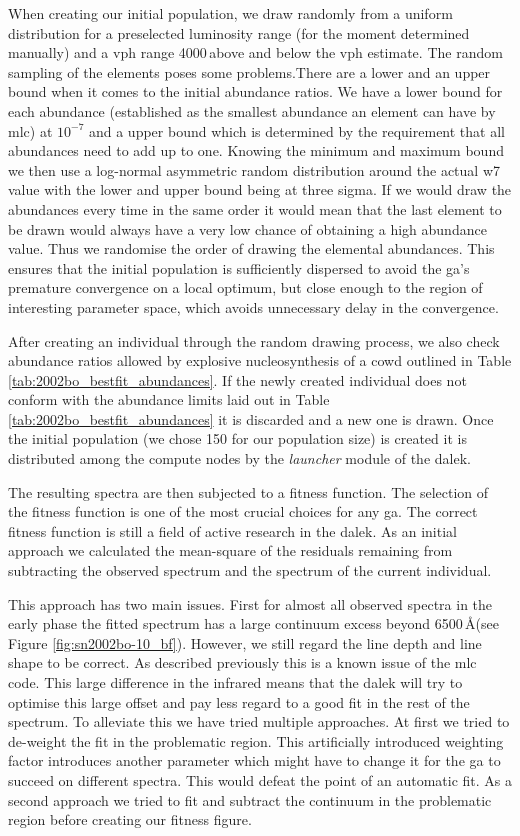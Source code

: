 When creating our initial population, we draw randomly from a uniform distribution for a preselected luminosity range (for the moment determined manually) and a \gls{vph} range 4000\,\kms above and below the \gls{vph} estimate. The random sampling of the elements poses some problems.There are a lower and an upper bound when it comes to the initial abundance ratios. We have a lower bound for each abundance (established as the smallest abundance an element can have by \gls{mlc}) at $10^{-7}$ and a upper bound which is determined by the requirement that all abundances need to add up to one. Knowing the minimum and maximum bound we then use a log-normal asymmetric random distribution around the actual \gls{w7} value with the lower and upper bound being at three sigma. If we would draw the abundances every time in the same order it would mean that the last element to be drawn would always have a very low chance of obtaining a high abundance value. Thus we randomise the order of drawing the elemental abundances. This ensures that the initial population is sufficiently dispersed to avoid the \gls{ga}'s premature convergence on a local optimum, but close enough to the region of interesting parameter space, which avoids unnecessary delay in the convergence. 

After creating an individual through the random drawing process, we also check abundance ratios allowed by explosive nucleosynthesis of a \gls{cowd} outlined in Table \ref{tab:2002bo_bestfit_abundances}. If the newly created individual does not conform with the abundance limits laid out in Table \ref{tab:2002bo_bestfit_abundances} it is discarded and a new one is drawn. Once the initial population (we chose 150 for our population size) is created it is distributed among the compute nodes by the \emph{launcher} module of the \gls{dalek}.

The resulting spectra are then subjected to a fitness function. The selection of the fitness function is one of the most crucial choices for any \gls{ga}. The correct fitness function is still a field of active research in the \gls{dalek}. As an initial approach we calculated the mean-square of the residuals remaining from subtracting the observed spectrum and the spectrum of the current individual. 

This approach has two main issues. First for almost all observed spectra in the early phase the fitted spectrum has a large continuum excess beyond 6500\,\AA (see Figure \ref{fig:sn2002bo-10_bf}). However, we still regard the line depth and line shape to be correct. As described previously this is a known issue of the \gls{mlc} code. This large difference in the infrared means that the \gls{dalek} will try to optimise this large offset and pay less regard to a good fit in the rest of the spectrum. To alleviate this we have tried multiple approaches. At first we tried to de-weight the fit in the problematic region. This artificially introduced weighting factor introduces another parameter which might have to change it for the \gls{ga} to succeed on different spectra. This would defeat the point of an automatic fit. As a second approach we tried to fit and subtract the continuum in the problematic region before creating our fitness figure. 

